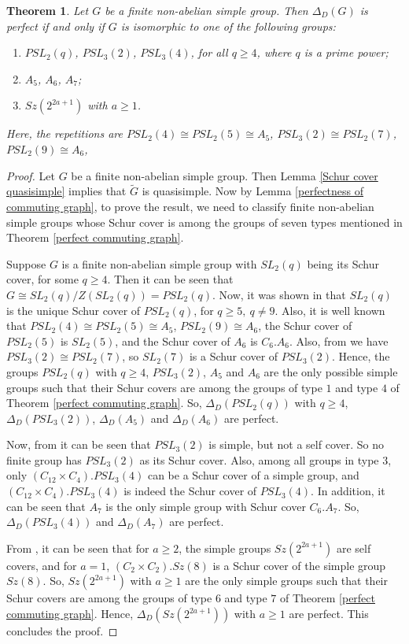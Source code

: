 \documentclass[12pt,a4paper]{article}
\newtheorem{theorem}{Theorem}[section]
\begin{document}
\begin{theorem}\label{Simple group perfect}
Let $G$ be a finite non-abelian simple group. Then $\Delta_D(G)$ is perfect if and only if $G$ is isomorphic to one of the following groups:
\begin{enumerate}[\rm (i)]
    \item $PSL_2(q)$, $PSL_3(2)$, $PSL_3(4)$, for all $q\geq 4$, where $q$ is a prime power;
    \item $A_5$, $A_6$, $A_7$;
    \item $Sz(2^{2a+1})$ with $a\geq 1$.
\end{enumerate}
Here, the repetitions are $PSL_2(4)\cong PSL_2(5)\cong A_5$, $PSL_3(2)\cong PSL_2(7)$, $PSL_2(9)\cong A_6$,   
\end{theorem}

\begin{proof}
Let $G$ be a finite non-abelian simple group. Then Lemma \ref{Schur cover quasisimple} implies that $\tilde{G}$ is quasisimple. Now by Lemma \ref{perfectness of commuting graph}, to prove the result, we need to classify finite non-abelian simple groups whose Schur cover is among the groups of seven types mentioned in Theorem \ref{perfect commuting graph}.

Suppose $G$ is a finite non-abelian simple group with $SL_2(q)$ being its Schur cover, for some $q\geq 4$. Then it can be seen that $G\cong SL_2(q)/Z(SL_2(q))=PSL_2(q)$. Now, it was shown in \cite[Theorem 7.1.1(ii)]{karpi} that $SL_2(q)$ is the unique Schur cover of $PSL_2(q)$, for $q\geq 5,~q\neq 9$. Also, it is well known \cite[Page-245(iv)]{karpi} that $PSL_2(4)\cong PSL_2(5)\cong A_5$, $PSL_2(9)\cong A_6$, the Schur cover of $PSL_2(5)$ is $SL_2(5)$, and the Schur cover of $A_6$ is $C_6.A_6$. Also, from \cite[Page-245(iv)]{karpi} we have $PSL_3(2)\cong PSL_2(7)$, so $SL_2(7)$ is a Schur cover of $PSL_3(2)$. Hence, the groups $PSL_2(q)$ with $q\geq 4$, $PSL_3(2)$, $A_5$ and $A_6$ are the only possible simple groups such that their Schur covers are among the groups of type $1$ and type $4$ of Theorem \ref{perfect commuting graph}. So, $\Delta_D(PSL_2(q))$ with $q\geq 4$, $\Delta_D(PSL_3(2))$, $\Delta_D(A_5)$ and $\Delta_D(A_6)$ are perfect.

Now, from \cite[Theorem 7.1.1(ii)]{karpi} it can be seen that $PSL_3(2)$ is simple, but not a self cover. So no finite group has $PSL_3(2)$ as its Schur cover. Also, among all groups in type $3$, only $(C_{12}\times C_4).PSL_3(4)$ can be a Schur cover of a simple group, and $(C_{12}\times C_4).PSL_3(4)$ is indeed the Schur cover of $PSL_3(4)$. In addition, it can be seen that $A_7$ is the only simple group with Schur cover $C_6.A_7$. So, $\Delta_D(PSL_3(4))$ and $\Delta_D(A_7)$ are perfect.

From \cite[Theorem 7.4.2]{karpi}, it can be seen that for $a\geq 2$, the simple groups $Sz(2^{2a+1})$ are self covers, and for $a=1$, $(C_2\times C_2).Sz(8)$ is a Schur cover of the simple group $Sz(8)$. So, $Sz(2^{2a+1})$ with $a\geq 1$ are the only simple groups such that their Schur covers are among the groups of type $6$ and type $7$ of Theorem \ref{perfect commuting graph}. Hence, $\Delta_D(Sz(2^{2a+1}))$ with $a\geq 1$ are perfect. This concludes the proof.   
\end{proof}
\end{document}
